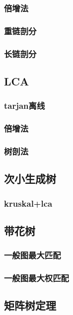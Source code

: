 \documentclass[10pt,a4paper]{article}
\begin{document}
	\subsubsection{倍增法}
	
	\subsubsection{重链剖分}
	
	\subsubsection{长链剖分}
	
	\subsection{LCA}
	\subsubsection{tarjan离线}
	
	\subsubsection{倍增法}
	
	\subsubsection{树剖法}
	
	\subsection{次小生成树}
	\subsubsection{kruskal+lca}
	
	\subsection{带花树}
	\subsubsection{一般图最大匹配}
	
	\subsubsection{一般图最大权匹配}
	
	\subsection{矩阵树定理}
\end{document}
